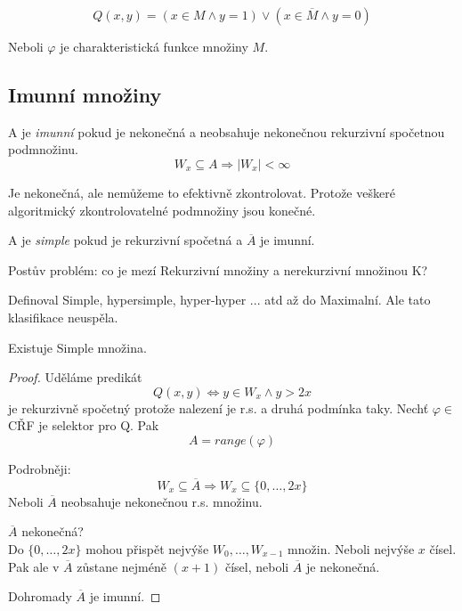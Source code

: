 \begin{theorem}
	\[ Q(x,y) = (x \in M \land y = 1) \lor (x \in \overline{M} \land y = 0) \]

	Neboli $\varphi$ je charakteristická funkce množiny $M$.
\end{theorem}

\subsection{Imunní množiny}

\begin{definition}
	A je \emph{imunní} pokud je nekonečná a neobsahuje nekonečnou rekurzivní spočetnou podmnožinu.
	\[ W_x \subseteq A \Rightarrow |W_x| < \infty \]

	Je nekonečná, ale nemůžeme to efektivně zkontrolovat.
	Protože veškeré algoritmický zkontrolovatelné podmnožiny jsou konečné.
\end{definition}

\begin{definition}[Simple]
	A je \emph{simple} pokud je rekurzivní spočetná a $\overline{A}$ je imunní.
\end{definition}

\begin{note}
	Postův problém: co je mezí Rekurzivní množiny a nerekurzivní množinou K?

	Definoval Simple, hypersimple, hyper-hyper ... atd až do Maximalní.
	Ale tato klasifikace neuspěla.
\end{note}

\begin{theorem}
	Existuje Simple množina.
\end{theorem}
\begin{proof}
	Uděláme predikát
	\[ Q(x, y) \iff y \in W_x \land y > 2x \]
	je rekurzivně spočetný protože nalezení je r.s. a druhá podmínka taky.
	Nechť $\varphi \in $ CŘF je selektor pro Q.
	Pak
	\[ A = range(\varphi) \]

	Podrobněji:
	\[ W_x \subseteq \overline{A} \Rightarrow W_x \subseteq \{ 0, \ldots, 2x \} \]
	Neboli $\overline{A}$ neobsahuje nekonečnou r.s. množinu.

	$\overline{A}$ nekonečná? \\
	Do $\{ 0, \ldots, 2x \}$ mohou přispět nejvýše $W_0, \ldots, W_{x - 1}$ množin.
	Neboli nejvýše $x$ čísel.
	Pak ale v $\overline{A}$ zůstane nejméně $(x + 1)$ čísel, neboli $\overline{A}$ je nekonečná.

	Dohromady $\overline{A}$ je imunní.

\end{proof}
